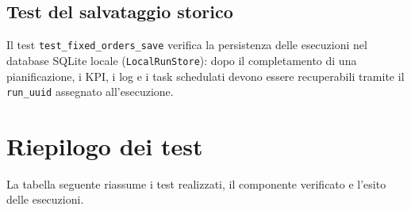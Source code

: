 \subsection{Test del salvataggio storico}

Il test \texttt{test\_fixed\_orders\_save} verifica la persistenza delle esecuzioni nel database SQLite locale (\texttt{LocalRunStore}): dopo il completamento di una pianificazione, i KPI, i log e i task schedulati devono essere recuperabili tramite il \texttt{run\_uuid} assegnato all'esecuzione.

\section{Riepilogo dei test}

La tabella seguente riassume i test realizzati, il componente verificato e l'esito delle esecuzioni.

